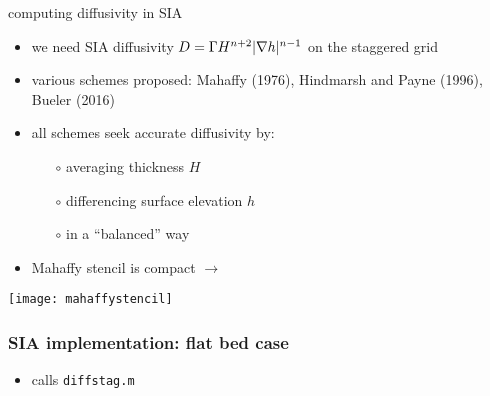 \begin{frame}{computing diffusivity in SIA}

\begin{itemize}
\item we need SIA diffusivity $D = \Gamma H^{n+2} |\nabla h|^{n-1}$ on the staggered grid
\item various schemes proposed: Mahaffy (1976), Hindmarsh and Payne (1996), Bueler (2016)
\item all schemes seek accurate diffusivity by:
  \begin{itemize}
  \item[$\circ$] averaging thickness $H$
  \item[$\circ$] differencing surface elevation $h$
  \item[$\circ$] in a ``balanced'' way
  \end{itemize}
\item Mahaffy stencil is compact $\longrightarrow$
\end{itemize}

\vspace{-10mm}
\hfill  \texttt{[image: mahaffystencil]}
\end{frame}


\begin{frame}
  \frametitle{SIA implementation: flat bed case}


\small
\begin{itemize}
\item calls \texttt{diffstag.m}
\end{itemize}
\end{frame}


